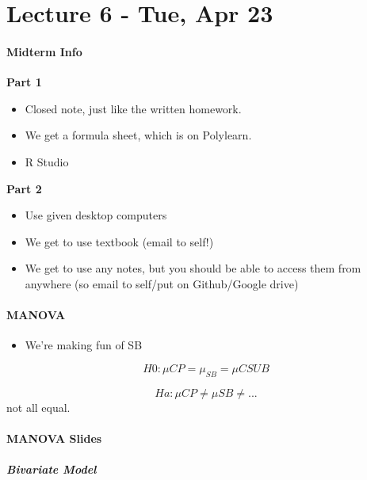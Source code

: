 \hypertarget{lecture-6---tue-apr-23}{%
\chapter{Lecture 6 - Tue, Apr 23}\label{lecture-6---tue-apr-23}}

\hypertarget{midterm-info}{%
\subsubsection{Midterm Info}\label{midterm-info}}

\textbf{Part 1}

\begin{itemize}
\tightlist
\item
  Closed note, just like the written homework.
\item
  We get a formula sheet, which is on Polylearn.
\item
  R Studio
\end{itemize}

\textbf{Part 2}

\begin{itemize}
\tightlist
\item
  Use given desktop computers
\item
  We get to use textbook (email to self!)
\item
  We get to use any notes, but you should be able to access them from
  anywhere (so email to self/put on Github/Google drive)
\end{itemize}

\hypertarget{manova}{%
\subsubsection{MANOVA}\label{manova}}

\begin{itemize}
\tightlist
\item
  We're making fun of SB
\end{itemize}

\[H0: \mu{CP} = \mu_{SB} = \mu{CSU B} \]

\[Ha: \mu{CP} \ne \mu{SB} \ne ... \] not all equal.

\hypertarget{manova-slides}{%
\subsubsection{MANOVA Slides}\label{manova-slides}}

\hypertarget{bivariate-model}{%
\paragraph{Bivariate Model}\label{bivariate-model}}

